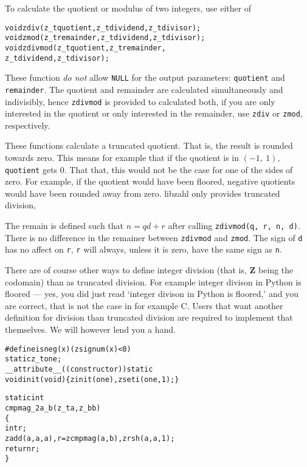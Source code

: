 To calculate the quotient or modulus of two integers,
use either of

\begin{alltt}
   void zdiv(z_t quotient, z_t dividend, z_t divisor);
   void zmod(z_t remainder, z_t dividend, z_t divisor);
   void zdivmod(z_t quotient, z_t remainder,
                z_t dividend, z_t divisor);
\end{alltt}

\noindent
These function \emph{do not} allow {\tt NULL}
for the output parameters: {\tt quotient} and
{\tt remainder}. The quotient and remainder are
calculated simultaneously and indivisibly, hence
{\tt zdivmod} is provided to calculated both, if
you are only interested in the quotient or only
interested in the remainder, use {\tt zdiv} or
{\tt zmod}, respectively.

These functions calculate a truncated quotient.
That is, the result is rounded towards zero. This
means for example that if the quotient is in
$(-1,~1)$, {\tt quotient} gets 0. That that, this
would not be the case for one of the sides of zero.
For example, if the quotient would have been
floored, negative quotients would have been rounded
away from zero. libzahl only provides truncated
division,

The remain is defined such that $n = qd + r$ after
calling {\tt zdivmod(q, r, n, d)}. There is no
difference in the remainer between {\tt zdivmod}
and {\tt zmod}. The sign of {\tt d} has no affect
on {\tt r}, {\tt r} will always, unless it is zero,
have the same sign as {\tt n}.

There are of course other ways to define integer
division (that is, \textbf{Z} being the codomain)
than as truncated division. For example integer
divison in Python is floored — yes, you did just
read `integer divison in Python is floored,' and
you are correct, that is not the case in for
example C. Users that want another definition
for division than truncated division are required
to implement that themselves. We will however
lend you a hand.

\begin{alltt}
   #define isneg(x) (zsignum(x) < 0)
   static z_t one;
   \textcolor{c}{__attribute__((constructor)) static}
   void init(void) \{ zinit(one), zseti(one, 1); \}

   static int
   cmpmag_2a_b(z_t a, z_b b)
   \{
       int r;
       zadd(a, a, a), r = zcmpmag(a, b), zrsh(a, a, 1);
       return r;
   \}
\end{alltt}

